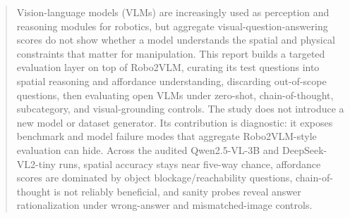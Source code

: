 \begin{abstract}
Vision-language models (VLMs) are increasingly used as perception and reasoning modules for robotics, but aggregate visual-question-answering scores do not show whether a model understands the spatial and physical constraints that matter for manipulation. This report builds a targeted evaluation layer on top of Robo2VLM, curating its test questions into spatial reasoning and affordance understanding, discarding out-of-scope questions, then evaluating open VLMs under zero-shot, chain-of-thought, subcategory, and visual-grounding controls. The study does not introduce a new model or dataset generator. Its contribution is diagnostic: it exposes benchmark and model failure modes that aggregate Robo2VLM-style evaluation can hide. Across the audited Qwen2.5-VL-3B and DeepSeek-VL2-tiny runs, spatial accuracy stays near five-way chance, affordance scores are dominated by object blockage/reachability questions, chain-of-thought is not reliably beneficial, and sanity probes reveal answer rationalization under wrong-answer and mismatched-image controls.
\end{abstract}
